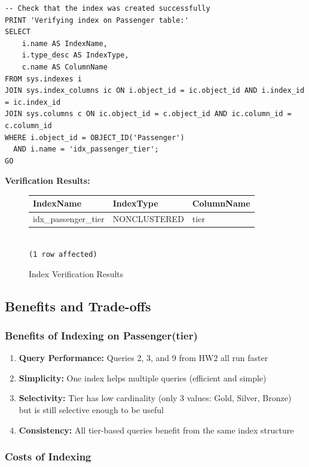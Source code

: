 \documentclass[12pt]{article}
\begin{document}
\begin{lstlisting}
-- Check that the index was created successfully
PRINT 'Verifying index on Passenger table:'
SELECT 
    i.name AS IndexName,
    i.type_desc AS IndexType,
    c.name AS ColumnName
FROM sys.indexes i
JOIN sys.index_columns ic ON i.object_id = ic.object_id AND i.index_id = ic.index_id
JOIN sys.columns c ON ic.object_id = c.object_id AND ic.column_id = c.column_id
WHERE i.object_id = OBJECT_ID('Passenger') 
  AND i.name = 'idx_passenger_tier';
GO
\end{lstlisting}

\textbf{Verification Results:}

\begin{figure}[h]
\centering
\begin{tabular}{|l|l|l|}
\hline
\textbf{IndexName} & \textbf{IndexType} & \textbf{ColumnName} \\
\hline
idx\_passenger\_tier & NONCLUSTERED & tier \\
\hline
\end{tabular}\\[0.3cm]
\texttt{(1 row affected)}
\caption{Index Verification Results}
\end{figure}

\subsection{Benefits and Trade-offs}

\subsubsection{Benefits of Indexing on Passenger(tier)}

\begin{enumerate}
    \item \textbf{Query Performance:} Queries 2, 3, and 9 from HW2 all run faster
    \item \textbf{Simplicity:} One index helps multiple queries (efficient and simple)
    \item \textbf{Selectivity:} Tier has low cardinality (only 3 values: Gold, Silver, Bronze) but is still selective enough to be useful
    \item \textbf{Consistency:} All tier-based queries benefit from the same index structure
\end{enumerate}

\subsubsection{Costs of Indexing}
\end{document}
